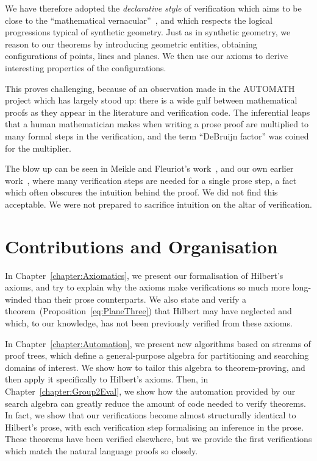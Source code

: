 We have therefore adopted the \emph{declarative style} of verification which aims to be close to the ``mathematical vernacular''~\cite{MizarMathematicalVernacular}, and which respects the logical progressions typical of synthetic geometry. Just as in synthetic geometry, we reason to our theorems by introducing geometric entities, obtaining configurations of points, lines and planes. We then use our axioms to derive interesting properties of the configurations.

This proves challenging, because of an observation made in the AUTOMATH project which has largely stood up: there is a wide gulf between mathematical proofs as they appear in the literature and verification code. The inferential leaps that a human mathematician makes when writing a prose proof are multiplied to many formal steps in the verification, and the term ``DeBruijn factor'' was coined for the multiplier. 

The blow up can be seen in Meikle and Fleuriot's work~\cite{MeikleFleuriotFormalizingHilbert}, and our own earlier work~\cite{ScottMScThesis}, where many verification steps are needed for a single prose step, a fact which often obscures the intuition behind the proof. We did not find this acceptable. We were not prepared to sacrifice intuition on the altar of verification.

\section{Contributions and Organisation}
In Chapter~\ref{chapter:Axiomatics}, we present our formalisation of Hilbert's axioms, and try to explain why the axioms make verifications so much more long-winded than their prose counterparts. We also state and verify a theorem~(Proposition~\ref{eq:PlaneThree}) that Hilbert may have neglected and which, to our knowledge, has not been previously verified from these axioms.

In Chapter~\ref{chapter:Automation}, we present new algorithms based on streams of proof trees, which define a general-purpose algebra for partitioning and searching domains of interest. We show how to tailor this algebra to theorem-proving, and then apply it specifically to Hilbert's axioms. Then, in Chapter~\ref{chapter:Group2Eval}, we show how the automation provided by our search algebra can greatly reduce the amount of code needed to verify theorems. In fact, we show that our verifications become almost structurally identical to Hilbert's prose, with each verification step formalising an inference in the prose. These theorems have been verified elsewhere, but we provide the first verifications which match the natural language proofs so closely.

